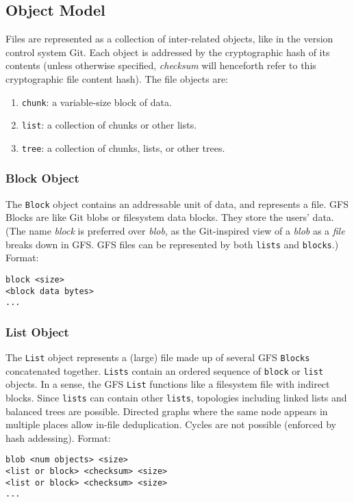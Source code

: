 \documentclass{sig-alternate}
\begin{document}
\subsection{Object Model}

Files are represented as a collection of inter-related objects, like in the
version control system Git. Each object is addressed by the cryptographic hash of its contents (unless otherwise specified, \textit{checksum} will henceforth refer to this cryptographic file content hash). The file objects are:

\begin{enumerate}
  \item \texttt{chunk}: a variable-size block of data.
  \item \texttt{list}: a collection of chunks or other lists.
  \item \texttt{tree}: a collection of chunks, lists, or other trees.
\end{enumerate}

\subsubsection{Block Object}

The \texttt{Block} object contains an addressable unit of data, and
represents a file.
GFS Blocks are like Git blobs or filesystem data blocks. They store the
users' data. (The name \textit{block} is preferred over \textit{blob}, as the
Git-inspired view of a \textit{blob} as a \textit{file} breaks down in GFS.
GFS files can be represented by both \texttt{lists} and \texttt{blocks}.)
Format:
\begin{verbatim}
block <size>
<block data bytes>
...
\end{verbatim}


\subsubsection{List Object}

The \texttt{List} object represents a (large) file made up of several
GFS \texttt{Blocks} concatenated together. \texttt{Lists} contain
an ordered sequence of \texttt{block} or \texttt{list} objects.
In a sense, the GFS \texttt{List} functions like a filesystem file with
indirect blocks. Since \texttt{lists} can contain other \texttt{lists}, topologies including linked lists and balanced trees are possible. Directed graphs where the same node appears in multiple places allow in-file deduplication. Cycles are not possible (enforced by hash addessing).
Format:
\begin{verbatim}
blob <num objects> <size>
<list or block> <checksum> <size>
<list or block> <checksum> <size>
...
\end{verbatim}
\end{document}
